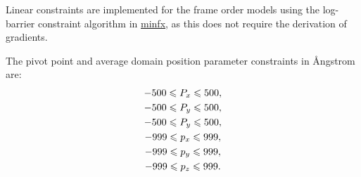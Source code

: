 Linear constraints are implemented for the frame order models using the log-barrier constraint algorithm in \href{https://sourceforge.net/projects/minfx/}{minfx}, as this does not require the derivation of gradients.

The pivot point and average domain position parameter constraints in \AA ngstrom are:
\begin{subequations}
\begin{gather}
    -500 \leqslant P_x \leqslant 500, \\
    -500 \leqslant P_y \leqslant 500, \\
    -500 \leqslant P_y \leqslant 500, \\
    -999 \leqslant p_x \leqslant 999, \\
    -999 \leqslant p_y \leqslant 999, \\
    -999 \leqslant p_z \leqslant 999.
\end{gather}
\end{subequations}

